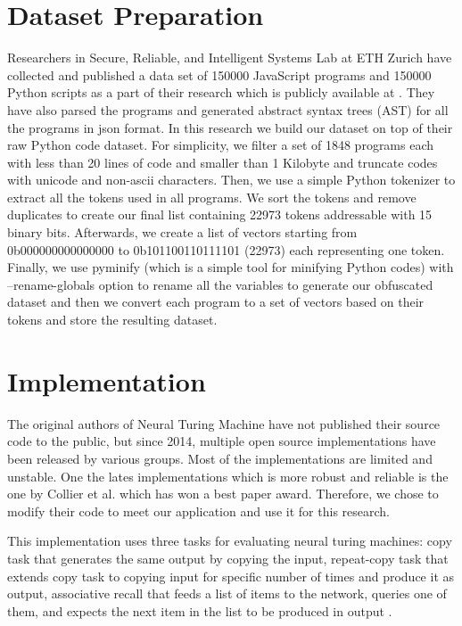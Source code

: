 \documentclass[acmsmall]{acmart}
\begin{document}
\section{Dataset Preparation}
Researchers in Secure, Reliable, and Intelligent Systems Lab at ETH Zurich have collected and published a data set of 150000 JavaScript programs and 150000 Python scripts as a part of their research \cite{jsnice} which is publicly available at \cite{bigcodedataset}. They have also parsed the programs and generated abstract syntax trees (AST) for all the programs in json format. In this research we build our dataset on top of their raw Python code dataset. For simplicity, we filter a set of 1848 programs each with less than 20 lines of code and smaller than 1 Kilobyte and truncate codes with unicode and non-ascii characters. Then, we use a simple Python tokenizer \cite{tokenizer} to extract all the tokens used in all programs. We sort the tokens and remove duplicates to create our final list containing 22973 tokens addressable with 15 binary bits. Afterwards, we create a list of vectors starting from 0b000000000000000 to 0b101100110111101 (22973) each representing one token. Finally, we use pyminify \cite{pyminify} (which is a simple tool for minifying Python codes) with --rename-globals option to rename all the variables to generate our obfuscated dataset and then we convert each program to a set of vectors based on their tokens and store the resulting dataset.

\section{Implementation}
The original authors of Neural Turing Machine have not published their source code to the public, but since 2014, multiple open source implementations have been released by various groups. Most of the implementations are limited and unstable. One the lates implementations which is more robust and reliable is the one by Collier et al. \cite{collier} which has won a best paper award. Therefore, we chose to modify their code to meet our application and use it for this research.

This implementation uses three tasks for evaluating neural turing machines: copy task that generates the same output by copying the input, repeat-copy task that extends copy task to copying input for specific number of times and produce it as output, associative recall that feeds a list of items to the network, queries one of them, and expects the next item in the list to be produced in output \cite{}.
\end{document}

